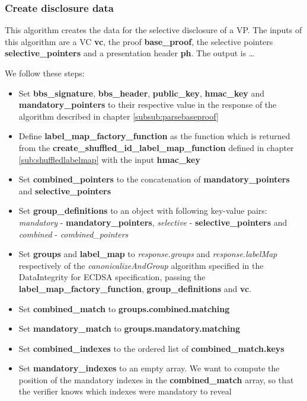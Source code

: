 \documentclass[
	a4paper               %
	,bibliography=totoc   %
	,listof=totoc         %
	,monolingual
	twoside=false,
]{bfhthesis}              %
\begin{document}
\subsubsection{Create disclosure data}
\label{subsub:createdisclosuredata}

This algorithm creates the data for the selective disclosure of a VP.
The inputs of this algorithm are a VC \textbf{vc}, the proof \textbf{base\_proof}, the selective pointers \textbf{selective\_pointers} and a presentation header \textbf{ph}.
The output is \dots

We follow these steps:
\begin{itemize}
	\item Set \textbf{bbs\_signature}, \textbf{bbs\_header}, \textbf{public\_key}, \textbf{hmac\_key} and \textbf{mandatory\_pointers} to their respective value in the response of the algorithm described in chapter \ref{subsub:parsebaseproof}
	\item Define \textbf{label\_map\_factory\_function} as the function which is returned from the \textbf{create\_shuffled\_id\_label\_map\_function} defined in chapter \ref{sub:shuffledlabelmap} with the input \textbf{hmac\_key}
	\item Set \textbf{combined\_pointers} to the concatenation of \textbf{mandatory\_pointers} and \textbf{selective\_pointers}
	\item Set \textbf{group\_definitions} to an object with following key-value pairs: \textit{mandatory} - \textbf{mandatory\_pointers}, \textit{selective} - \textbf{selective\_pointers} and \textit{combined} - \textit{combined\_pointers}
	\item Set \textbf{groups} and \textbf{label\_map} to \textit{response.groups} and \textit{response.labelMap} respectively of the \textit{canonicalizeAndGroup} algorithm specified in the DataIntegrity for ECDSA specification\cite{ecdsa}, passing the \textbf{label\_map\_factory\_function}, \textbf{group\_definitions} and \textbf{vc}.
	\item Set \textbf{combined\_match} to \textbf{groups.combined.matching}
	\item Set \textbf{mandatory\_match} to \textbf{groups.mandatory.matching}
	\item Set \textbf{combined\_indexes} to the ordered list of \textbf{combined\_match.keys}
	\item Set \textbf{mandatory\_indexes} to an empty array. We want to compute the position of the mandatory indexes in the \textbf{combined\_match} array, so that the verifier knows which indexes were mandatory to reveal

\end{itemize}
\end{document}
